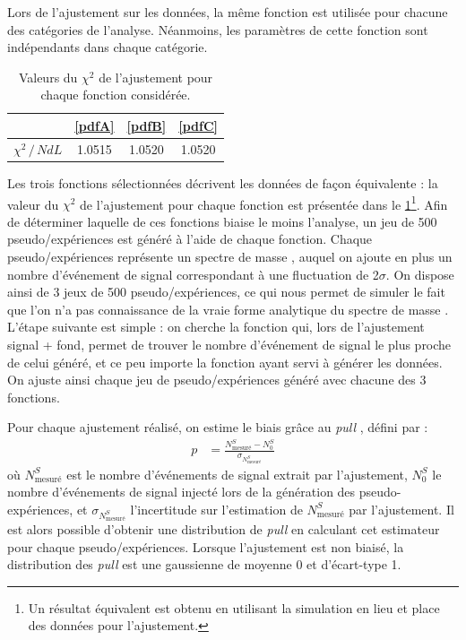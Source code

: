 Lors de l'ajustement sur les données, la même fonction est utilisée pour chacune des catégories de l'analyse. Néanmoins, les paramètres de cette fonction sont indépendants dans chaque catégorie.

\begin{table} \centering
\begin{tabular}{@{}cccc@{}} \toprule
 & \ref{pdfA} & \ref{pdfB} & \ref{pdfC} \\ \midrule
 $\chi^2 \, / \, NdL$ & \num{1.0515} & \num{1.0520} & \num{1.0520} \\
 \bottomrule
\end{tabular}
\caption{Valeurs du $\chi^2$ de l'ajustement pour chaque fonction considérée.}
\label{tab:chi2}
\end{table}

Les trois fonctions sélectionnées décrivent les données de façon équivalente : la valeur du $\chi^2$ de l'ajustement pour chaque fonction est présentée dans le \cref{tab:chi2}\footnote{Un résultat équivalent est obtenu en utilisant la simulation en lieu et place des données pour l'ajustement.}. Afin de déterminer laquelle de ces fonctions biaise le moins l'analyse, un jeu de 500 pseudo\-/expériences est généré à l'aide de chaque fonction. Chaque pseudo\-/expériences représente un spectre de masse \ttbar, auquel on ajoute en plus un nombre d'événement de signal correspondant à une fluctuation de 2$\sigma$. On dispose ainsi de 3 jeux de 500 pseudo\-/expériences, ce qui nous permet de simuler le fait que l'on n'a pas connaissance de la vraie forme analytique du spectre de masse \ttbar. L'étape suivante est simple : on cherche la fonction qui, lors de l'ajustement signal + fond, permet de trouver le nombre d'événement de signal le plus proche de celui généré, et ce peu importe la fonction ayant servi à générer les données. On ajuste ainsi chaque jeu de pseudo\-/expériences généré avec chacune des 3 fonctions.

Pour chaque ajustement réalisé, on estime le biais grâce au \emph{pull} \citep{pulls}, défini par :
\begin{align*}
  p &= \frac{N^S_\text{mesuré} - N^S_{0}}{\sigma_{N^S_\text{mesuré}}}
\end{align*}
où $N^S_\text{mesuré}$ est le nombre d'événements de signal extrait par l'ajustement, $N^S_{0}$ le nombre d'événements de signal injecté lors de la génération des pseudo-expérien\-ces, et $\sigma_{N^S_\text{mesuré}}$ l'incertitude sur l'estimation de $N^S_\text{mesuré}$ par l'ajustement. Il est alors possible d'obtenir une distribution de \emph{pull} en calculant cet estimateur pour chaque pseudo\-/expériences. Lorsque l'ajustement est non biaisé, la distribution des \emph{pull} est une gaussienne de moyenne 0 et d'écart-type 1.

